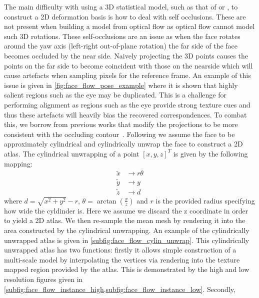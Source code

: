 The main difficulty with using a 3D statistical model, such as that of
\citet{paysan20093d} or \citet{booth2016lsfm}, to construct a 2D
deformation basis is how to deal with self occlusions. These are not present when
building a model from optical flow as optical flow cannot model such 3D rotations.
These self-occlusions are an issue as when the face rotates around the yaw axis 
(left-right out-of-plane rotation) the far side of the face becomes occluded
by the near side. Naively projecting the 3D points causes the points on the far
side to become coincident with those on the nearside which will cause artefacts
when sampling pixels for the reference frame. An example of this issue
is given in \cref{fig:face_flow_pose_example} where it is shown that highly
salient regions such as the eye may be duplicated. This is a challenge for 
performing alignment as regions such as the eye provide strong texture cues and
thus these artefacts will heavily bias the recovered correspondences. To combat
this, we borrow from previous works that modify the projections to be more
consistent with the occluding contour~\cite{Zhu:2015ur,zhu2015high,hassner2015effective}.
Following \citet{zhu2015high} we assume the face to be approximately cylindrical and
cylindrically unwrap the face to construct a 2D atlas. The cylindrical unwrapping
of a point ${[x, y, z]}^T$ is given by the following mapping:
\begin{equation}
    \begin{aligned}
        \tilde{x} &\rightarrow r \theta \\
        \tilde{y} &\rightarrow y \\
        \tilde{z} &\rightarrow d
    \end{aligned}
\end{equation}
where $d = \sqrt{x^2 + y^2} - r$,
$\theta = \arctan{\left(\frac{x}{z}\right)}$ and $r$ is the provided radius 
specifying how wide the cyldinder is. Here we assume we discard the z
coordinate in order to yield a 2D atlas.
We then re-sample the mean mesh by rendering it into the area constructed by the
cylindrical unwrapping. An example of the cylindrically unwrapped atlas is given
in \cref{subfig:face_flow_cylin_unwrap}. 
This cylindrically unwrapped atlas has two functions: firstly it
allows simple construction of a multi-scale model by interpolating the vertices 
via rendering into the texture mapped region provided by the atlas. 
This is demonstrated by the high
and low resolution figures given in 
\cref{subfig:face_flow_instance_high,subfig:face_flow_instance_low}. Secondly,
